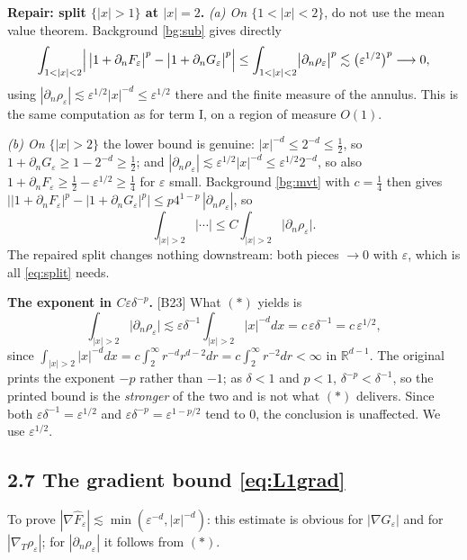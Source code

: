\documentclass[11pt,reqno]{amsart}
\theoremstyle{plain}
\theoremstyle{definition}
\theoremstyle{plain}
\theoremstyle{definition}
\theoremstyle{remark}
\newcommand{\Rdm}{\mathbb{R}^{d-1}}
\newcommand{\nd}{\partial_n}
\newcommand{\Ftil}{\widehat{F}_\varepsilon}
\newcommand{\Ledger}[1]{{\scriptsize\textsf{[#1]}}}
\begin{document}
\begin{filled}
\textbf{Repair: split $\{|x|>1\}$ at $|x|=2$.}
\emph{(a) On $\{1<|x|<2\}$}, do not use the mean value theorem. Background
\ref{bg:sub} gives directly
\[\int_{1<|x|<2}\Bigl|\,\bigl|1+\nd F_\varepsilon\bigr|^p
   -\bigl|1+\nd G_\varepsilon\bigr|^p\Bigr|
  \le\int_{1<|x|<2}\bigl|\nd\rho_\varepsilon\bigr|^p
  \lesssim\bigl(\varepsilon^{1/2}\bigr)^{p}\longrightarrow0,\]
using $|\nd\rho_\varepsilon|\lesssim\varepsilon^{1/2}|x|^{-d}\le\varepsilon^{1/2}$
there and the finite measure of the annulus. This is the same computation as for
term I, on a region of measure $O(1)$.

\emph{(b) On $\{|x|>2\}$} the lower bound is genuine: $|x|^{-d}\le2^{-d}\le\frac12$,
so $1+\nd G_\varepsilon\ge1-2^{-d}\ge\frac12$; and
$|\nd\rho_\varepsilon|\lesssim\varepsilon^{1/2}|x|^{-d}\le\varepsilon^{1/2}2^{-d}$,
so also $1+\nd F_\varepsilon\ge\frac12-\varepsilon^{1/2}\ge\frac14$ for
$\varepsilon$ small. Background \ref{bg:mvt} with $c=\frac14$ then gives
$\bigl||1+\nd F_\varepsilon|^p-|1+\nd G_\varepsilon|^p\bigr|
 \le p4^{1-p}\,|\nd\rho_\varepsilon|$, so
\[\int_{|x|>2}\bigl|\cdots\bigr|\le C\int_{|x|>2}\bigl|\nd\rho_\varepsilon\bigr| .\]
The repaired split changes nothing downstream: both pieces $\to0$ with
$\varepsilon$, which is all \eqref{eq:split} needs.
\end{filled}

\begin{expansion}
\textbf{The exponent in $C\varepsilon\delta^{-p}$.} \Ledger{B23} What $(*)$ yields
is
\[\int_{|x|>2}\bigl|\nd\rho_\varepsilon\bigr|
 \lesssim\varepsilon\delta^{-1}\int_{|x|>2}|x|^{-d}dx
 =c\,\varepsilon\delta^{-1}=c\,\varepsilon^{1/2},\]
since $\int_{|x|>2}|x|^{-d}dx=c\int_2^\infty r^{-d}r^{d-2}dr=c\int_2^\infty
r^{-2}dr<\infty$ in $\Rdm$. The original prints the exponent $-p$ rather than $-1$;
as $\delta<1$ and $p<1$, $\delta^{-p}<\delta^{-1}$, so the printed bound is the
\emph{stronger} of the two and is not what $(*)$ delivers. Since both
$\varepsilon\delta^{-1}=\varepsilon^{1/2}$ and
$\varepsilon\delta^{-p}=\varepsilon^{1-p/2}$ tend to $0$, the conclusion is
unaffected. We use $\varepsilon^{1/2}$.
\end{expansion}

\subsection*{2.7 The gradient bound \eqref{eq:L1grad}}

To prove $|\nabla\Ftil|\lesssim\min(\varepsilon^{-d},|x|^{-d})$: this estimate is
obvious for $|\nabla G_\varepsilon|$ and for $|\nabla_T\rho_\varepsilon|$; for
$|\nd\rho_\varepsilon|$ it follows from $(*)$.
\end{document}
